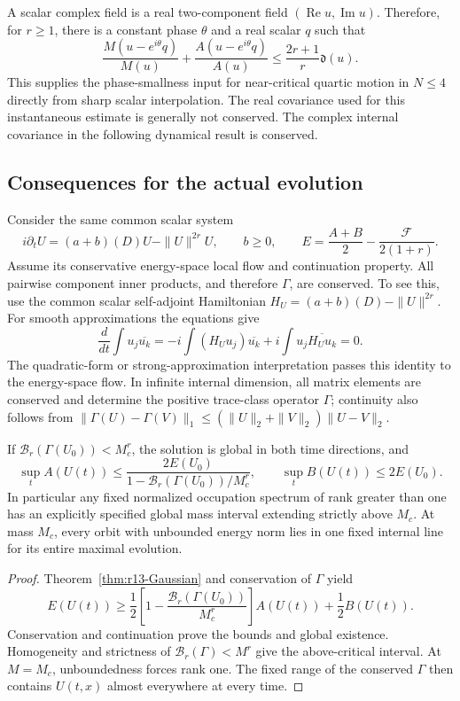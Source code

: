 A scalar complex field is a real two-component field
$(\operatorname{Re}u,\operatorname{Im}u)$. Therefore, for $r\ge1$,
there is a constant phase $\theta$ and a real scalar $q$ such that
\begin{equation}\label{eq:r13-explicitphase}
 \frac{M(u-e^{i\theta}q)}{M(u)}+
 \frac{A(u-e^{i\theta}q)}{A(u)}
 \le\frac{2r+1}{r}\mathfrak d(u).
\end{equation}
This supplies the phase-smallness input for near-critical quartic
motion in $N\le4$ directly from sharp scalar interpolation.
The real covariance used for this instantaneous estimate is generally
not conserved. The complex internal covariance in the following
dynamical result is conserved.

\subsection{Consequences for the actual evolution}
Consider the same common scalar system
\[
 i\partial_tU=(a+b)(D)U-\|U\|^{2r}U,\qquad b\ge0,
 \qquad E=\frac{A+B}{2}-\frac{\mathcal F}{2(1+r)}.
\]
Assume its conservative energy-space local flow and continuation
property. All pairwise component inner products, and therefore
$\Gamma$, are conserved. To see this, use the common scalar
self-adjoint Hamiltonian $H_U=(a+b)(D)-\|U\|^{2r}$. For smooth
approximations the equations give
\[
 \frac{d}{dt}\int u_j\overline{u_k}
 =-i\int (H_Uu_j)\overline{u_k}
   +i\int u_j\overline{H_Uu_k}=0.
\]
The quadratic-form or strong-approximation interpretation passes this
identity to the energy-space flow. In infinite internal dimension,
all matrix elements are conserved and determine the positive trace-class
operator $\Gamma$; continuity also follows from
$\|\Gamma(U)-\Gamma(V)\|_1
\le(\|U\|_2+\|V\|_2)\|U-V\|_2$.

\begin{theorem}
\label{thm:r13-spectrumflow}
If $\mathcal B_r(\Gamma(U_0))<M_c^r$, the solution is global in both
time directions, and
\[
 \sup_t A(U(t))\le
 \frac{2E(U_0)}{1-\mathcal B_r(\Gamma(U_0))/M_c^r},
 \qquad \sup_t B(U(t))\le2E(U_0).
\]
In particular any fixed normalized occupation spectrum of rank greater
than one has an explicitly specified global mass interval extending
strictly above $M_c$. At mass $M_c$, every orbit with unbounded energy
norm lies in one fixed internal line for its entire maximal evolution.
\end{theorem}
\begin{proof}
Theorem~\ref{thm:r13-Gaussian} and conservation of $\Gamma$ yield
\[
 E(U(t))\ge\frac12
 \left[1-\frac{\mathcal B_r(\Gamma(U_0))}{M_c^r}\right]A(U(t))
 +\frac12 B(U(t)).
\]
Conservation and continuation prove the bounds and global existence.
Homogeneity and strictness of $\mathcal B_r(\Gamma)<M^r$ give the
above-critical interval. At $M=M_c$, unboundedness forces rank one.
The fixed range of the conserved $\Gamma$ then contains $U(t,x)$
almost everywhere at every time.
\end{proof}

